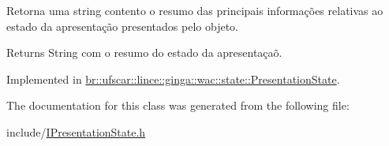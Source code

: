 Retorna uma string contento o resumo das principais informações relativas ao estado da apresentação presentados pelo objeto. 

\begin{DoxyReturn}{Returns}
String com o resumo do estado da apresentaçaõ. 
\end{DoxyReturn}


Implemented in \hyperlink{classbr_1_1ufscar_1_1lince_1_1ginga_1_1wac_1_1state_1_1PresentationState_a00ec06809774af254532488cc1559c15}{br::ufscar::lince::ginga::wac::state::PresentationState}.



The documentation for this class was generated from the following file:\begin{DoxyCompactItemize}
\item 
include/\hyperlink{IPresentationState_8h}{IPresentationState.h}\end{DoxyCompactItemize}
